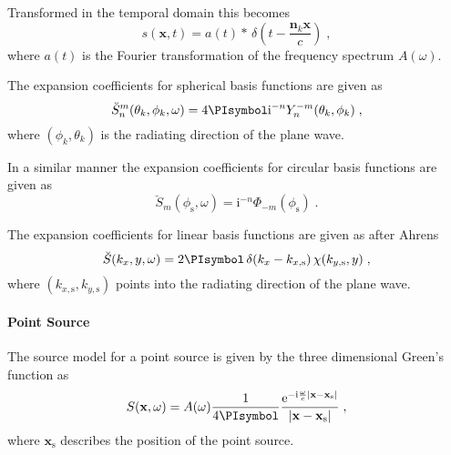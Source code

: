 \documentclass[a4paper]{book}
\newcommand{\reproduce}[1]{%
    \href{#1}{\color{link}\large\Pointinghand}%
}%
\newcommand{\ft}{\footnotesize}                                   %
\newcommand{\PI}{\PIsymbol}%
\newcommand{\I}{\mathrm{i}}                          %
\newcommand{\E}{\mathrm{e}}                          %
\renewcommand{\vec}[1]{\mathbf{#1}}                  %
\newcommand{\x}{\vec{x}}                             %
\newcommand{\xs}{\x_\text{s}}                        %
\newcommand{\n}{\vec{n}}                             %
\newcommand{\omegac}{\frac{\omega}{c}}               %
\newcommand{\deltafunc}[1]{\,\delta\!\left(#1\right)}%
\newcommand{\qc}{\;,}                                             %
\newcommand{\qp}{\;.}                                             %
\newcommand\eqlabel[2][]{%
  \label{eq:#2}%
}
\begin{document}
{Transformed in the temporal domain this becomes
%
\begin{equation}
    s(\x,t) = a(t) * \deltafunc{t -\frac{\n_k \x}{c}}
    \qc
    \eqlabel{s:pw}
\end{equation}
where $a(t)$ is the Fourier transformation of the frequency spectrum $A(\omega)$.

The expansion coefficients for spherical basis functions are given
as\cite[][(2.38)]{Ahrens2012}
%
\begin{equation}
    \breve{S}_n^m(\theta_k,\phi_k,\omega) = 4\PI \I^{-n} Y_n^{-m}(\theta_k,\phi_k)
    \qc
    \label{eq:plane_wave_spherical}
\end{equation}
%
where $(\phi_k,\theta_k)$ is the radiating direction of the plane wave.

In a similar manner the expansion coefficients for circular basis functions are
given as
%
\begin{equation}
    \breve{S}_m(\phi_\text{s},\omega) = \I^{-n} \Phi_{-m}(\phi_\text{s}) \qp
    \label{eq:plane_wave_circular}
\end{equation}
%

The expansion coefficients for linear basis functions are
given as after Ahrens\cite[][(C.5)]{Ahrens2012}
%
\begin{equation}
    \breve{S}(k_x,y,\omega) = 2\PI \deltafunc{k_x-k_{x,\text{s}}}
    \chi(k_{y,\text{s}},y)
    \qc
    \label{eq:plane_wave_linear}
\end{equation}
%
where $(k_{x,\text{s}},k_{y,\text{s}})$ points into the radiating direction of
the plane wave.


\paragraph{Point Source}
\label{sec:point_source}
%
%    
%
The source model for a point source is given by the three dimensional Green's
function as\cite[][(6.73)]{Williams1999}
%
\begin{equation}
    S(\x,\omega) = A(\omega) \frac{1}{4\PI}
    \frac{\E^{-\I\omegac|\x-\xs|}}{|\x-\xs|}
    \qc
    \eqlabel{S:ps}
\end{equation}
%
where $\xs$ describes the position of the point source.

}
\end{document}
